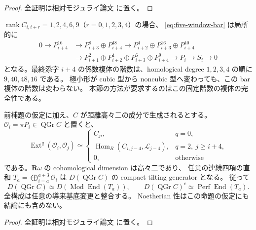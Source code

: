 \begin{proof}
全証明は相対モジュライ論文 \cite[\texttt{noncubic_local_tails}]{QuadricModuli2026} に置く。
\end{proof}

\begin{remark}[二次曲面の固定階数の五頂点複体]
\label{rem:five-window-fixed-ranks}
$\operatorname{rank} C_{i,i+r}=1,2,4,6,9$（$r=0,1,2,3,4$）の場合、
\eqref{eq:five-window-bar} は局所的に
\begin{align*}
0\longrightarrow P_{i+4}^{16}&\longrightarrow
 P_{i+3}^{8}\oplus P_{i+4}^{48}
 \longrightarrow P_{i+2}^{4}\oplus P_{i+3}^{16}\oplus P_{i+4}^{40}\\
 &\longrightarrow P_{i+1}^{2}\oplus P_{i+2}^{4}
       \oplus P_{i+3}^{6}\oplus P_{i+4}^{9}
 \longrightarrow P_i\longrightarrow S_i\longrightarrow0
\end{align*}
となる。最終添字 $i+4$ の係数複体の階数は、homological degree
$1,2,3,4$ の順に $9,40,48,16$ である。
極小形が cubic 型から noncubic 型へ変わっても、この bar 複体の階数は変わらない。
本節の方法が要求するのはこの固定階数の複体の完全性である。
\end{remark}

\begin{proposition}
\label{prop:five-window-canonical-tails}
前補題の仮定に加え、$C$ が距離高々二の成分で生成されるとする。
$\mathcal O_i=\pi P_i\in\operatorname{QGr}C$ と置くと、
\[
 \operatorname{Ext}^q(\mathcal O_i,\mathcal O_j)\simeq
 \begin{cases}
 C_{ji},&q=0,\\
 \operatorname{Hom}_R(C_{i,j-4},\mathcal L_{j-4}),&q=2,\ j\ge i+4,\\
 0,&\text{otherwise}
 \end{cases}
 \tag{BW-coh}\label{eq:five-window-tails-cohomology}
\]
である。$\mathbf R\omega$ の cohomological dimension は高々二であり、
任意の連続四項の直和 $T_a=\bigoplus_{i=a}^{a+3}\mathcal O_i$ は
$D(\operatorname{QGr}C)$ の compact tilting generator となる。
従って
\[
 D(\operatorname{QGr}C)\simeq D(\operatorname{Mod}\operatorname{End}(T_a)),
 \qquad D(\operatorname{QGr}C)^c\simeq\operatorname{Perf}\operatorname{End}(T_a).
 \tag{BW-Morita}\label{eq:five-window-tails-morita}
\]
全構成は任意の導来基底変更と整合する。
Noetherian 性はこの命題の仮定にも結論にも含めない。
\end{proposition}

\begin{proof}
全証明は相対モジュライ論文 \cite[\texttt{noncubic_local_tails}]{QuadricModuli2026} に置く。
\end{proof}

